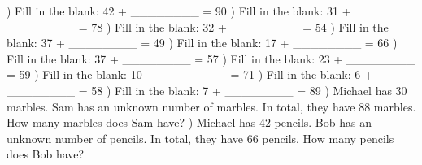 \documentclass{article}%
\begin{document}
\newline%
\newline%
) Fill in the blank: 42 + \_\_\_\_\_\_\_\_ = 90%
\newline%
\newline%
) Fill in the blank: 31 + \_\_\_\_\_\_\_\_ = 78%
\newline%
\newline%
) Fill in the blank: 32 + \_\_\_\_\_\_\_\_ = 54%
\newline%
\newline%
) Fill in the blank: 37 + \_\_\_\_\_\_\_\_ = 49%
\newline%
\newline%
) Fill in the blank: 17 + \_\_\_\_\_\_\_\_ = 66%
\newline%
\newline%
) Fill in the blank: 37 + \_\_\_\_\_\_\_\_ = 57%
\newline%
\newline%
) Fill in the blank: 23 + \_\_\_\_\_\_\_\_ = 59%
\newline%
\newline%
) Fill in the blank: 10 + \_\_\_\_\_\_\_\_ = 71%
\newline%
\newline%
) Fill in the blank: 6 + \_\_\_\_\_\_\_\_ = 58%
\newline%
\newline%
) Fill in the blank: 7 + \_\_\_\_\_\_\_\_ = 89%
\newline%
\newline%
) Michael has 30 marbles. Sam has an unknown number of marbles. In total, they have 88 marbles. How many marbles does Sam have?%
\newline%
\newline%
) Michael has 42 pencils. Bob has an unknown number of pencils. In total, they have 66 pencils. How many pencils does Bob have?%
\newline%
\end{document}
